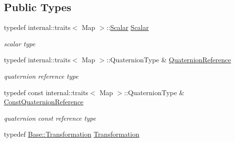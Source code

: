 \subsection*{Public Types}
\begin{DoxyCompactItemize}
\item 
typedef internal\+::traits$<$ Map $>$\+::\hyperlink{class_eigen_1_1_map_3_01_sophus_1_1_rx_s_o3_group_3_01___scalar_01_4_00_01___options_01_4_a7810f1290abcedb01ffc558ddef2484f}{Scalar} \hyperlink{class_eigen_1_1_map_3_01_sophus_1_1_rx_s_o3_group_3_01___scalar_01_4_00_01___options_01_4_a7810f1290abcedb01ffc558ddef2484f}{Scalar}\hypertarget{class_eigen_1_1_map_3_01_sophus_1_1_rx_s_o3_group_3_01___scalar_01_4_00_01___options_01_4_a7810f1290abcedb01ffc558ddef2484f}{}\label{class_eigen_1_1_map_3_01_sophus_1_1_rx_s_o3_group_3_01___scalar_01_4_00_01___options_01_4_a7810f1290abcedb01ffc558ddef2484f}

\begin{DoxyCompactList}\small\item\em scalar type \end{DoxyCompactList}\item 
typedef internal\+::traits$<$ Map $>$\+::Quaternion\+Type \& \hyperlink{class_eigen_1_1_map_3_01_sophus_1_1_rx_s_o3_group_3_01___scalar_01_4_00_01___options_01_4_a01177f5e76c76c682e092fa794a5ae15}{Quaternion\+Reference}\hypertarget{class_eigen_1_1_map_3_01_sophus_1_1_rx_s_o3_group_3_01___scalar_01_4_00_01___options_01_4_a01177f5e76c76c682e092fa794a5ae15}{}\label{class_eigen_1_1_map_3_01_sophus_1_1_rx_s_o3_group_3_01___scalar_01_4_00_01___options_01_4_a01177f5e76c76c682e092fa794a5ae15}

\begin{DoxyCompactList}\small\item\em quaternion reference type \end{DoxyCompactList}\item 
typedef const internal\+::traits$<$ Map $>$\+::Quaternion\+Type \& \hyperlink{class_eigen_1_1_map_3_01_sophus_1_1_rx_s_o3_group_3_01___scalar_01_4_00_01___options_01_4_a02c1dbb3516a5492fab49f7aeb74b264}{Const\+Quaternion\+Reference}\hypertarget{class_eigen_1_1_map_3_01_sophus_1_1_rx_s_o3_group_3_01___scalar_01_4_00_01___options_01_4_a02c1dbb3516a5492fab49f7aeb74b264}{}\label{class_eigen_1_1_map_3_01_sophus_1_1_rx_s_o3_group_3_01___scalar_01_4_00_01___options_01_4_a02c1dbb3516a5492fab49f7aeb74b264}

\begin{DoxyCompactList}\small\item\em quaternion const reference type \end{DoxyCompactList}\item 
typedef \hyperlink{class_sophus_1_1_rx_s_o3_group_base_a60b2d8cd20692d3d39e5e7c729d95145}{Base\+::\+Transformation} \hyperlink{class_eigen_1_1_map_3_01_sophus_1_1_rx_s_o3_group_3_01___scalar_01_4_00_01___options_01_4_a2647ff9bb47ba1f5c7e4d15c3c9a298e}{Transformation}\hypertarget{class_eigen_1_1_map_3_01_sophus_1_1_rx_s_o3_group_3_01___scalar_01_4_00_01___options_01_4_a2647ff9bb47ba1f5c7e4d15c3c9a298e}{}\label{class_eigen_1_1_map_3_01_sophus_1_1_rx_s_o3_group_3_01___scalar_01_4_00_01___options_01_4_a2647ff9bb47ba1f5c7e4d15c3c9a298e}


\end{DoxyCompactItemize}
